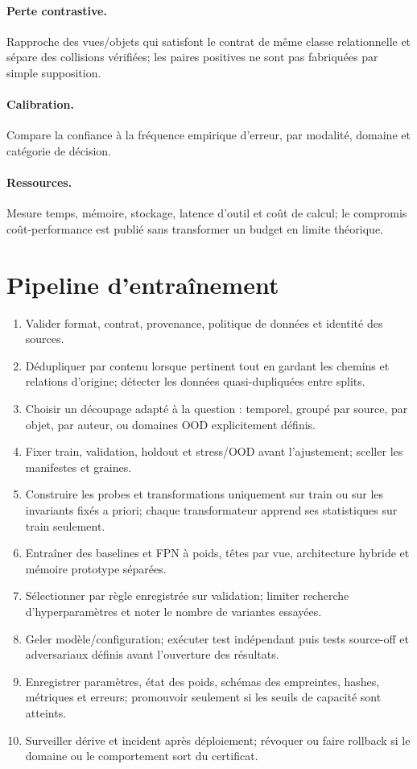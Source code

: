 \documentclass[11pt,a4paper]{report}
\begin{document}
\paragraph{Perte contrastive.} Rapproche des vues/objets qui satisfont le contrat de même classe relationnelle et sépare des collisions vérifiées; les paires positives ne sont pas fabriquées par simple supposition.
\paragraph{Calibration.} Compare la confiance à la fréquence empirique d'erreur, par modalité, domaine et catégorie de décision.
\paragraph{Ressources.} Mesure temps, mémoire, stockage, latence d'outil et coût de calcul; le compromis coût-performance est publié sans transformer un budget en limite théorique.

\section{Pipeline d'entraînement}
\begin{enumerate}[leftmargin=1.6em]
\item Valider format, contrat, provenance, politique de données et identité des sources.
\item Dédupliquer par contenu lorsque pertinent tout en gardant les chemins et relations d'origine; détecter les données quasi-dupliquées entre splits.
\item Choisir un découpage adapté à la question : temporel, groupé par source, par objet, par auteur, ou domaines OOD explicitement définis.
\item Fixer train, validation, holdout et stress/OOD avant l'ajustement; sceller les manifestes et graines.
\item Construire les probes et transformations uniquement sur train ou sur les invariants fixés a priori; chaque transformateur apprend ses statistiques sur train seulement.
\item Entraîner des baselines et FPN à poids, têtes par vue, architecture hybride et mémoire prototype séparées.
\item Sélectionner par règle enregistrée sur validation; limiter recherche d'hyperparamètres et noter le nombre de variantes essayées.
\item Geler modèle/configuration; exécuter test indépendant puis tests source-off et adversariaux définis avant l'ouverture des résultats.
\item Enregistrer paramètres, état des poids, schémas des empreintes, hashes, métriques et erreurs; promouvoir seulement si les seuils de capacité sont atteints.
\item Surveiller dérive et incident après déploiement; révoquer ou faire rollback si le domaine ou le comportement sort du certificat.
\end{enumerate}
\end{document}
